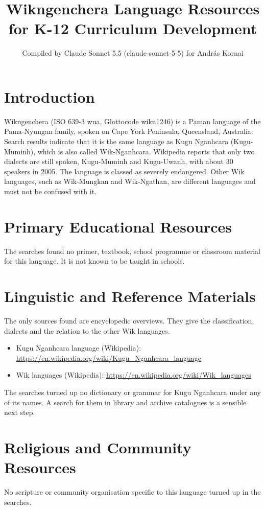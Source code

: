 \documentclass[12pt]{article}
\title{Wikngenchera Language Resources for K-12 Curriculum Development}
\author{Compiled by Claude Sonnet 5.5 (claude-sonnet-5-5) for Andr\'as Kornai}
\date{}
\begin{document}
\maketitle

\section{Introduction}
Wikngenchera (ISO 639-3 wua, Glottocode wikn1246) is a Paman language of the Pama-Nyungan family, spoken on Cape York Peninsula, Queensland, Australia. Search results indicate that it is the same language as Kugu Nganhcara (Kugu-Muminh), which is also called Wik-Nganhcara. Wikipedia reports that only two dialects are still spoken, Kugu-Muminh and Kugu-Uwanh, with about 30 speakers in 2005. The language is classed as severely endangered. Other Wik languages, such as Wik-Mungkan and Wik-Ngathan, are different languages and must not be confused with it.

\section{Primary Educational Resources}
The searches found no primer, textbook, school programme or classroom material for this language. It is not known to be taught in schools.

\section{Linguistic and Reference Materials}
The only sources found are encyclopedic overviews. They give the classification, dialects and the relation to the other Wik languages.
\begin{itemize}
\item Kugu Nganhcara language (Wikipedia): \url{https://en.wikipedia.org/wiki/Kugu_Nganhcara_language}
\item Wik languages (Wikipedia): \url{https://en.wikipedia.org/wiki/Wik_languages}
\end{itemize}
The searches turned up no dictionary or grammar for Kugu Nganhcara under any of its names. A search for them in library and archive catalogues is a sensible next step.

\section{Religious and Community Resources}
No scripture or community organisation specific to this language turned up in the searches.
\end{document}
